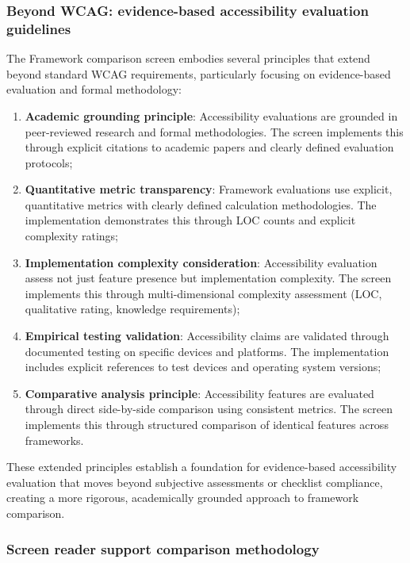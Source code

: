 \subsubsection{Beyond WCAG: evidence-based accessibility evaluation guidelines}

The Framework comparison screen embodies several principles that extend beyond standard WCAG requirements, particularly focusing on evidence-based evaluation and formal methodology:

\begin{enumerate}
    \item \textbf{Academic grounding principle}: Accessibility evaluations are grounded in peer-reviewed research and formal methodologies. The screen implements this through explicit citations to academic papers and clearly defined evaluation protocols;
    
    \item \textbf{Quantitative metric transparency}: Framework evaluations use explicit, quantitative metrics with clearly defined calculation methodologies. The implementation demonstrates this through LOC counts and explicit complexity ratings;
    
    \item \textbf{Implementation complexity consideration}: Accessibility evaluation assess not just feature presence but implementation complexity. The screen implements this through multi-dimensional complexity assessment (LOC, qualitative rating, knowledge requirements);
    
    \item \textbf{Empirical testing validation}: Accessibility claims are validated through documented testing on specific devices and platforms. The implementation includes explicit references to test devices and operating system versions;
    
    \item \textbf{Comparative analysis principle}: Accessibility features are evaluated through direct side-by-side comparison using consistent metrics. The screen implements this through structured comparison of identical features across frameworks.
\end{enumerate}

These extended principles establish a foundation for evidence-based accessibility evaluation that moves beyond subjective assessments or checklist compliance, creating a more rigorous, academically grounded approach to framework comparison.

\subsubsection{Screen reader support comparison methodology}

